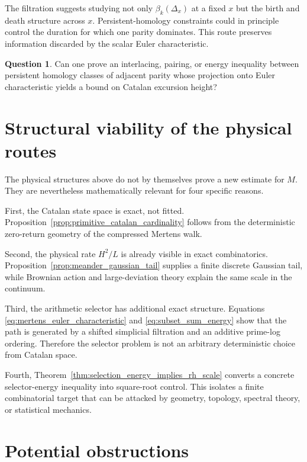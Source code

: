 \documentclass[11pt]{amsart}
\numberwithin{equation}{section}
\theoremstyle{plain}
\theoremstyle{definition}
\newtheorem{question}[theorem]{Question}
\theoremstyle{remark}
\newcommand{\Mert}{M}
\begin{document}
The filtration suggests studying not only $\beta_k(\Delta_x)$ at a fixed $x$ but the birth and death structure across $x$.  Persistent-homology constraints could in principle control the duration for which one parity dominates.  This route preserves information discarded by the scalar Euler characteristic.

\begin{question}
\label{question:persistent_parity}
Can one prove an interlacing, pairing, or energy inequality between persistent homology classes of adjacent parity whose projection onto Euler characteristic yields a bound on Catalan excursion height?
\end{question}

\section{Structural viability of the physical routes}
\label{sec:not_vacuous}

The physical structures above do not by themselves prove a new estimate for $\Mert$.  They are nevertheless mathematically relevant for four specific reasons.

First, the Catalan state space is exact, not fitted.  Proposition~\ref{prop:primitive_catalan_cardinality} follows from the deterministic zero-return geometry of the compressed Mertens walk.

Second, the physical rate $H^2/L$ is already visible in exact combinatorics.  Proposition~\ref{prop:meander_gaussian_tail} supplies a finite discrete Gaussian tail, while Brownian action and large-deviation theory explain the same scale in the continuum.

Third, the arithmetic selector has additional exact structure.  Equations \eqref{eq:mertens_euler_characteristic} and \eqref{eq:subset_sum_energy} show that the path is generated by a shifted simplicial filtration and an additive prime-log ordering.  Therefore the selector problem is not an arbitrary deterministic choice from Catalan space.

Fourth, Theorem~\ref{thm:selection_energy_implies_rh_scale} converts a concrete selector-energy inequality into square-root control.  This isolates a finite combinatorial target that can be attacked by geometry, topology, spectral theory, or statistical mechanics.

\section{Potential obstructions}
\label{sec:potential_obstructions}
\end{document}
